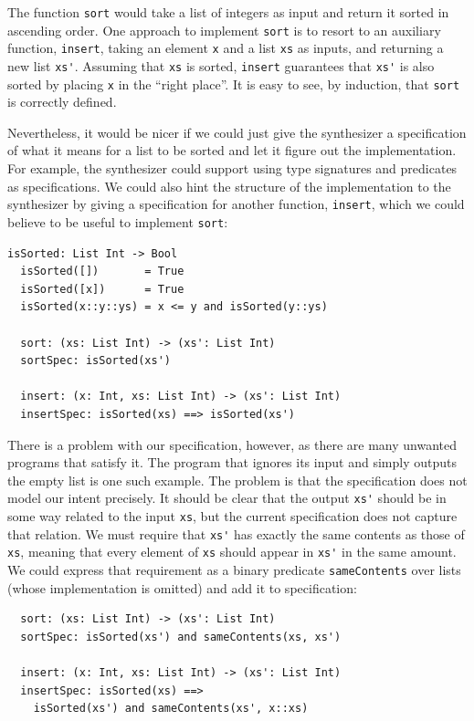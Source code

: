 \noindent
The function \lstinline{sort} would take a list of integers as input and return
it sorted in ascending order. One approach to implement \lstinline{sort} is to
resort to an auxiliary function, \lstinline{insert}, taking an element
\lstinline{x} and a list \lstinline{xs} as inputs, and returning a new list
\lstinline{xs'}. Assuming that \lstinline{xs} is sorted, \lstinline{insert}
guarantees that \lstinline{xs'} is also sorted by placing \lstinline{x} in the
``right place''. It is easy to see, by induction, that \lstinline{sort} is
correctly defined.

Nevertheless, it would be nicer if we could just give the synthesizer a
specification of what it means for a list to be sorted and let it figure out the
implementation. For example, the synthesizer could support using type signatures
and predicates as specifications. We could also hint the structure of the
implementation to the synthesizer by giving a specification for another
function, \lstinline{insert}, which we could believe to be useful to implement
\lstinline{sort}:

\begin{lstlisting}[xleftmargin=.2\textwidth]
  isSorted: List Int -> Bool
  isSorted([])       = True
  isSorted([x])      = True
  isSorted(x::y::ys) = x <= y and isSorted(y::ys)

  sort: (xs: List Int) -> (xs': List Int)
  sortSpec: isSorted(xs')

  insert: (x: Int, xs: List Int) -> (xs': List Int)
  insertSpec: isSorted(xs) ==> isSorted(xs')
\end{lstlisting}

\noindent
There is a problem with our specification, however, as there are many unwanted
programs that satisfy it.
The program that ignores its input and simply outputs the empty list is one such
example.
The problem is that the specification does not model our intent precisely.
It should be clear that the output \lstinline{xs'} should be in some way related
to the input \lstinline{xs}, but the current specification does not capture that
relation.
We must require that \lstinline{xs'} has exactly the same contents as those of
\lstinline{xs}, meaning that every element of \lstinline{xs} should appear in
\lstinline{xs'} in the same amount.
We could express that requirement as a binary predicate \lstinline{sameContents}
over lists (whose implementation is omitted) and add it to specification:

\begin{lstlisting}
  sort: (xs: List Int) -> (xs': List Int)
  sortSpec: isSorted(xs') and sameContents(xs, xs')

  insert: (x: Int, xs: List Int) -> (xs': List Int)
  insertSpec: isSorted(xs) ==>
    isSorted(xs') and sameContents(xs', x::xs)
\end{lstlisting}

